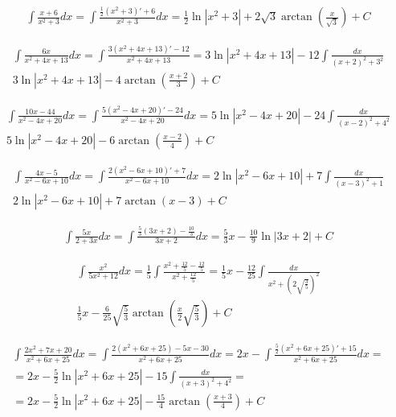 
\begin{gather*}\int \frac{x+6}{x^2+3}dx = \int \frac{\frac{1}{2}(x^2+3)'+6}{x^2+3}dx=\frac{1}{2}\ln|x^2+3|+2\sqrt{3}\arctan \left( \frac{x}{\sqrt{3}} \right)+C\end{gather*}



\begin{gather*}\int \frac{6x}{x^2+4x+13}dx = \int \frac{3(x^2+4x+13)'-12}{x^2+4x+13} = 3\ln|x^2+4x+13|-12\int \frac{dx}{(x+2)^2+3^2} \\
 3\ln|x^2+4x+13|-4\arctan \left( \frac{x+2}{3} \right)+C\end{gather*}



\begin{gather*}\int \frac{10x-44}{x^2-4x+20}dx = \int \frac{5(x^2-4x+20)'-24}{x^2-4x+20}dx = 5\ln|x^2-4x+20|-24\int \frac{dx}{(x-2)^2+4^2} \\
 5\ln|x^2-4x+20|-6\arctan \left( \frac{x-2}{4} \right)+C\end{gather*}



\begin{gather*}\int \frac{4x-5}{x^2-6x+10}dx = \int \frac{2(x^2-6x+10)'+7}{x^2-6x+10}dx = 2\ln|x^2-6x+10|+7\int \frac{dx}{(x-3)^2+1}\\
2\ln|x^2-6x+10|+7\arctan (x-3)+C\end{gather*}



\begin{gather*}\int \frac{5x}{2+3x}dx = \int \frac{\frac{5}{3}(3x+2)-\frac{10}{3}}{3x+2}dx = \frac{5}{3}x-\frac{10}{9}\ln|3x+2|+C\end{gather*}



\begin{gather*}\int \frac{x^2}{5x^2+12}dx = \frac{1}{5}\int \frac{x^2+\frac{12}{5}-\frac{12}{5}}{x^2+\frac{12}{5}} = \frac{1}{5}x-\frac{12}{25}\int \frac{dx}{x^2+(2\sqrt{\frac{3}{5}})^2} \\
 \frac{1}{5}x-\frac{6}{25}\sqrt{\frac{5}{3}}\arctan \left( \frac{x}{2}\sqrt{\frac{5}{3}}\right)+C\end{gather*}



\begin{gather*}\int \frac{2x^2+7x+20}{x^2+6x+25}dx = \int \frac{2(x^2+6x+25)-5x-30}{x^2+6x+25}dx = 2x - \int \frac{\frac{5}{2}(x^2+6x+25)'+15}{x^2+6x+25}dx = \\
= 2x -\frac{5}{2}\ln|x^2+6x+25|-15\int \frac{dx}{(x+3)^2+4^2} = \\
= 2x -\frac{5}{2}\ln|x^2+6x+25|-\frac{15}{4}\arctan \left(\frac{x+3}{4}\right)+C\end{gather*}


